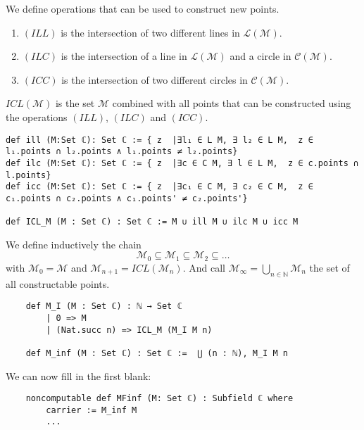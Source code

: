 \begin{definition}
    \label{def:rules_to_constructed_a_point}
    We define operations that can be used to construct new points.
    \begin{enumerate}
        \item $(ILL)$ is the intersection of two different lines in $\mathcal{L(M)}$.
        \item $(ILC)$ is the intersection of a line in $\mathcal{L(M)}$ and a circle in $\mathcal{C(M)}$.
        \item $(ICC)$ is the intersection of two different circles in $\mathcal{C(M)}$.
    \end{enumerate}
    $ICL(\mathcal{M})$ is the set $\mathcal{M}$ combined with all points that can be constructed using the operations $(ILL)$, $(ILC)$ and $(ICC)$.
\end{definition}

\begin{lstlisting}
def ill (M:Set ℂ): Set ℂ := { z  |∃l₁ ∈ L M, ∃ l₂ ∈ L M,  z ∈ l₁.points ∩ l₂.points ∧ l₁.points ≠ l₂.points}
def ilc (M:Set ℂ): Set ℂ := { z  |∃c ∈ C M, ∃ l ∈ L M,  z ∈ c.points ∩ l.points}
def icc (M:Set ℂ): Set ℂ := { z  |∃c₁ ∈ C M, ∃ c₂ ∈ C M,  z ∈ c₁.points ∩ c₂.points ∧ c₁.points' ≠ c₂.points'}    

def ICL_M (M : Set ℂ) : Set ℂ := M ∪ ill M ∪ ilc M ∪ icc M
\end{lstlisting}

\begin{definition}
    \label{def:set_of_constructable_points}
    We define inductively the chain
    \begin{equation*}
        \mathcal{M}_0 \subseteq \mathcal{M}_1 \subseteq \mathcal{M}_2 \subseteq \dots
    \end{equation*}
    with $\mathcal{M}_0 = \mathcal{M}$ and $\mathcal{M}_{n+1} = ICL(\mathcal{M}_n)$.\newline
    And call $\mathcal{M}_{\infty} = \bigcup_{n \in \mathbb{N}} \mathcal{M}_n$ the set of all constructable points.
\end{definition}

\begin{lstlisting}
    def M_I (M : Set ℂ) : ℕ → Set ℂ
        | 0 => M
        | (Nat.succ n) => ICL_M (M_I M n)

    def M_inf (M : Set ℂ) : Set ℂ :=  ⋃ (n : ℕ), M_I M n
\end{lstlisting}

We can now fill in the first blank:
\begin{lstlisting}
    noncomputable def MFinf (M: Set ℂ) : Subfield ℂ where
        carrier := M_inf M
        ...
\end{lstlisting}
